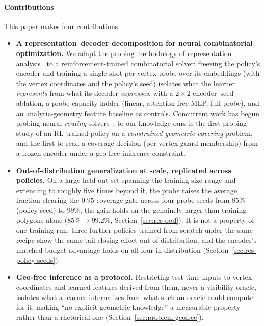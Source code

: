 \documentclass[11pt]{article}
\begin{document}
\paragraph{Contributions} This paper makes four contributions.
\begin{itemize}
  \item[\textbf{C1}] \textbf{A representation--decoder decomposition for neural combinatorial optimization.} We adapt the probing methodology of representation analysis~\cite{AlainBengio2017Probes,HewittLiang2019Probes,Belinkov2022Probing} to a reinforcement-trained combinatorial solver: freezing the policy's encoder and training a single-shot per-vertex probe over its embeddings (with the vertex coordinates and the policy's seed) isolates what the learner \emph{represents} from what its decoder \emph{expresses}, with a $2\times2$ encoder--seed ablation, a probe-capacity ladder (linear, attention-free MLP, full probe), and an analytic-geometry feature baseline as controls. Concurrent work has begun probing neural \emph{routing} solvers~\cite{Zhang2025ProbingNCO,Narad2026ProbingTSP}; to our knowledge ours is the first probing study of an RL-trained policy on a \emph{constrained geometric covering} problem, and the first to read a coverage decision (per-vertex guard membership) from a frozen encoder under a geo-free inference constraint.
  \item[\textbf{C2}] \textbf{Out-of-distribution generalization at scale, replicated across policies.} On a large held-out set spanning the training size range and extending to roughly five times beyond it, the probe raises the average fraction clearing the $0.95$ coverage gate across four probe seeds from $85\%$ (policy seed) to $99\%$; the gain holds on the genuinely larger-than-training polygons alone ($85\% \to 99.2\%$, Section~\ref{sec:res-ood}). It is not a property of one training run: three further policies trained from scratch under the same recipe show the same tail-closing effect out of distribution, and the encoder's matched-budget advantage holds on all four in distribution (Section~\ref{sec:res-policy-seeds}).
  \item[\textbf{C3}] \textbf{Geo-free inference as a protocol.} Restricting test-time inputs to vertex coordinates and learned features derived from them, never a visibility oracle, isolates what a learner internalizes from what such an oracle could compute for it, making ``no explicit geometric knowledge'' a measurable property rather than a rhetorical one (Section~\ref{sec:problem-geofree}).
  

\end{itemize}
\end{document}
